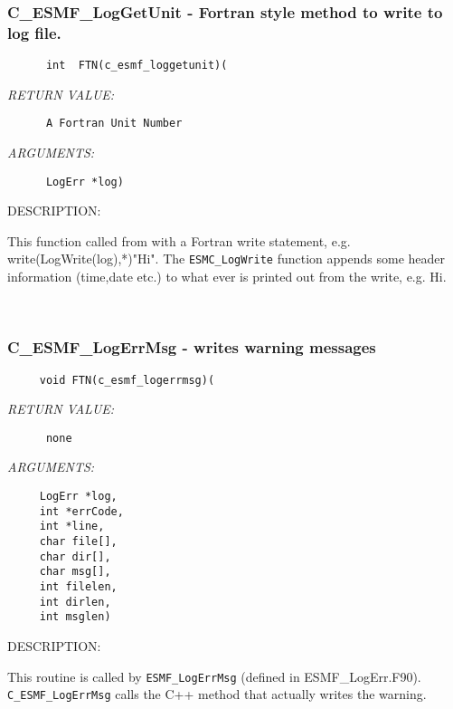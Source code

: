   \subsubsection [C\_ESMF\_LogGetUnit] {C\_ESMF\_LogGetUnit - Fortran style method to write to log file.}


  
\begin{verbatim}      int  FTN(c_esmf_loggetunit)(\end{verbatim}{\em RETURN VALUE:}
\begin{verbatim}      A Fortran Unit Number\end{verbatim}{\em ARGUMENTS:}
\begin{verbatim}      LogErr *log)\end{verbatim}
{\sf DESCRIPTION:\\ }


      This function called from with a Fortran write statement, e.g.
      write(LogWrite(log),*)"Hi".  The {\tt ESMC\_LogWrite} function
      appends some
      header information (time,date etc.) to what ever is printed out
      from the write, e.g. Hi. 
 
\mbox{}\hrulefill\ 
 
\subsubsection [C\_ESMF\_LogErrMsg] {C\_ESMF\_LogErrMsg - writes warning messages}


  
\begin{verbatim}     void FTN(c_esmf_logerrmsg)(\end{verbatim}{\em RETURN VALUE:}
\begin{verbatim}      none\end{verbatim}{\em ARGUMENTS:}
\begin{verbatim}     LogErr *log,
     int *errCode,
     int *line, 
     char file[],
     char dir[],
     char msg[], 
     int filelen,
     int dirlen,
     int msglen)\end{verbatim}
{\sf DESCRIPTION:\\ }


      This routine is called by {\tt ESMF\_LogErrMsg} (defined in ESMF\_LogErr.F90).  
      {\tt C\_ESMF\_LogErrMsg} calls the C++ method that actually writes
      the warning.
   
